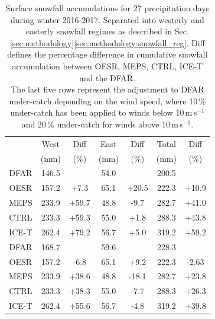 \documentclass{ametsocV5}
\begin{document}
\begin{table}[t]
	\caption{
		Surface snowfall accumulations for 27 precipitation days during winter 2016-2017. Separated into westerly and easterly snowfall regimes as described in Sec. \ref{sec:methodology}\ref{sec:methodology:snowfall_reg}. Diff defines the percentage difference in cumulative snowfall accumulation between OESR, MEPS, CTRL, ICE-T and the DFAR.\\
		The last five rows represent the adjustment to DFAR under-catch depending on the wind speed, where 10\,\% under-catch has been applied to winds below 10\,m\,s$^{-1}$ and 20\,\% under-catch for winds above 10\,m\,s$^{-1}$.
	}
	\label{tab:sfc_acc}
	\begin{center}
		\begin{tabular}{c||c|c|c|c|c|c}\hline\hline
			& West & Diff & East & Diff & Total & Diff  \\
			& (mm) & (\%) & (mm) & (\%) & (mm)  & (\%)   \\\hline\hline
			DFAR & 146.5 & & 54.0 & & 200.5 & \\\hline
			OESR & 157.2 & +7.3 & 65.1 & +20.5 & 222.3 & +10.9  \\\hline
			MEPS & 233.9 & +59.7 & 48.8 & -9.7 & 282.7 & +41.0  \\\hline
			CTRL & 233.3 & +59.3 & 55.0 & +1.8 & 288.3 & +43.8  \\\hline
			ICE-T & 262.4 & +79.2 & 56.7 & +5.0 & 319.2 & +59.2  \\\hline\hline
			DFAR & 168.7 & & 59.6 & & 228.3 & \\\hline
			OESR & 157.2 & -6.8 & 65.1 & +9.2 & 222.3 & -2.63  \\\hline
			MEPS & 233.9 & +38.6 & 48.8 & -18.1 & 282.7 & +23.8  \\\hline
			CTRL & 233.3 & +38.3 & 55.0 & -7.7 & 288.3 & +26.3  \\\hline
			ICE-T & 262.4 & +55.6 & 56.7 & -4.8 & 319.2 & +39.8  \\\hline 

		\end{tabular}
	\end{center}
\end{table}




\end{document}
